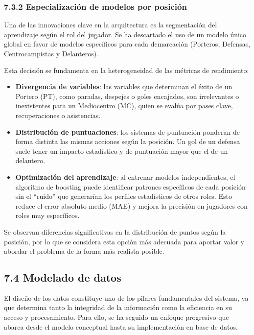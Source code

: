 \subsubsection{7.3.2 Especialización de modelos por posición}
 
Una de las innovaciones clave en la arquitectura es la segmentación del
aprendizaje según el rol del jugador. Se ha descartado el uso de un modelo único
global en favor de modelos específicos para cada demarcación (Porteros,
Defensas, Centrocampistas y Delanteros).
 
Esta decisión se fundamenta en la heterogeneidad de las métricas de rendimiento:
 
\begin{itemize}
\item \textbf{Divergencia de variables}: las variables que determinan el éxito de
un Portero (PT), como paradas, despejes o goles encajados, son irrelevantes o
inexistentes para un Mediocentro (MC), quien se evalúa por pases clave,
recuperaciones o asistencias.
 
\item \textbf{Distribución de puntuaciones}: los sistemas de puntuación ponderan
de forma distinta las mismas acciones según la posición. Un gol de un defensa
suele tener un impacto estadístico y de puntuación mayor que el de un delantero.
 
\item \textbf{Optimización del aprendizaje}: al entrenar modelos independientes,
el algoritmo de boosting puede identificar patrones específicos de cada posición
sin el ``ruido'' que generarían los perfiles estadísticos de otros roles. Esto
reduce el error absoluto medio (MAE) y mejora la precisión en jugadores con
roles muy específicos.
\end{itemize}
 
Se observan diferencias significativas en la distribución de puntos según la
posición, por lo que se considera esta opción más adecuada para aportar valor
y abordar el problema de la forma más realista posible.
 
\subsection{7.4 Modelado de datos}
El diseño de los datos constituye uno de los pilares fundamentales del sistema,
ya que determina tanto la integridad de la información como la eficiencia en su
acceso y procesamiento. Para ello, se ha seguido un enfoque progresivo que
abarca desde el modelo conceptual hasta su implementación en base de datos.
 
